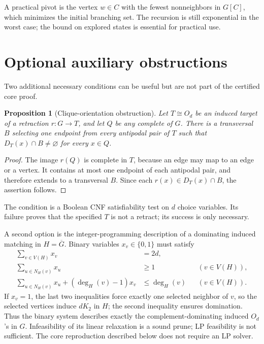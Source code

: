 \documentclass[11pt]{article}
\newtheorem{proposition}[theorem]{Proposition}
\newcommand{\DD}[2]{D_{#1}(#2)}
\begin{document}
A practical pivot is the vertex \(w\in C\) with the fewest
nonneighbors in \(G[C]\), which minimizes the initial branching
set. The recursion is still exponential in the worst case; the
bound on explored states is essential for practical use.

\section{Optional auxiliary obstructions}
Two additional necessary conditions can be useful but are not part
of the certified core proof.

\begin{proposition}[Clique-orientation obstruction]
\label{prop:clique-sat}
Let \(T\cong O_d\) be an induced target of a retraction
\(r:G\to T\), and let \(Q\) be any complete of \(G\).
There is a transversal \(B\) selecting one endpoint from every
antipodal pair of \(T\) such that
\(\DD T x\cap B\ne\varnothing\) for every \(x\in Q\).
\end{proposition}
\begin{proof}
The image \(r(Q)\) is complete in \(T\), because an edge may
map to an edge or a vertex. It contains at most one endpoint of
each antipodal pair, and therefore extends to a transversal
\(B\). Since each \(r(x)\in\DD T x\cap B\), the assertion follows.
\end{proof}

The condition is a Boolean CNF satisfiability test on \(d\) choice
variables. Its failure proves that the specified \(T\) is not a
retract; its success is only necessary.

A second option is the integer-programming description of a
dominating induced matching in \(H=\overline G\). Binary variables
\(x_v\in\{0,1\}\) must satisfy
\begin{align*}
\sum_{v\in V(H)}x_v&=2d,\\
\sum_{u\in N_H(v)}x_u&\ge1&& (v\in V(H)),\\
\sum_{u\in N_H(v)}x_u+(\deg_H(v)-1)x_v&\le\deg_H(v)&& (v\in V(H)).
\end{align*}
If \(x_v=1\), the last two inequalities force exactly one selected
neighbor of \(v\), so the selected vertices induce \(dK_2\) in
\(H\); the second inequality ensures domination. Thus the binary
system describes exactly the complement-dominating induced \(O_d\)'s
in \(G\). Infeasibility of its linear relaxation is a sound prune;
LP feasibility is not sufficient. The core reproduction described
below does not require an LP solver.
\end{document}
